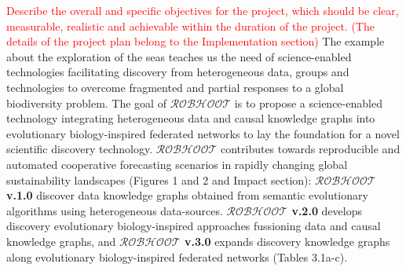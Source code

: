 \documentclass[11pt, a4paper]{article} %
\begin{document}
\textcolor{red}{Describe the overall and specific objectives for the
  project, which should be clear, measurable, realistic and achievable
  within the duration of the project. (The details of the project plan
  belong to the Implementation section)} The example about the
exploration of the seas teaches us the need of science-enabled
technologies facilitating discovery from heterogeneous data, groups
and technologies to overcome fragmented and partial responses to a
global biodiversity problem. The goal of $\mathcal{ROBHOOT}$ is to
propose a science-enabled technology integrating heterogeneous data
and causal knowledge graphs into evolutionary biology-inspired
federated networks to lay the foundation for a novel scientific
discovery technology. $\mathcal{ROBHOOT}$ contributes towards
reproducible and automated cooperative forecasting scenarios in
rapidly changing global sustainability landscapes (Figures 1 and 2 and
Impact section): {\bf $\mathcal{ROBHOOT}$ v.1.0} discover data
knowledge graphs obtained from semantic evolutionary algorithms using
heterogeneous data-sources. {\bf $\mathcal{ROBHOOT}$ v.2.0} develops
discovery evolutionary biology-inspired approaches fussioning data and
causal knowledge graphs, and {\bf $\mathcal{ROBHOOT}$ v.3.0} expands
discovery knowledge graphs along evolutionary biology-inspired
federated networks (Tables 3.1a-c).
\end{document}
